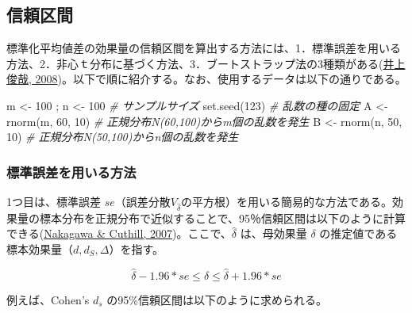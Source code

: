 \documentclass[
  ja=standard, xelatex, base=12pt]{bxjsreport}
\newenvironment{Shaded}{\begin{snugshade}}{\end{snugshade}}
\newcommand{\CommentTok}[1]{\textcolor[rgb]{0.56,0.35,0.01}{\textit{#1}}}
\newcommand{\DecValTok}[1]{\textcolor[rgb]{0.00,0.00,0.81}{#1}}
\newcommand{\FunctionTok}[1]{\textcolor[rgb]{0.00,0.00,0.00}{#1}}
\newcommand{\NormalTok}[1]{#1}
\newcommand{\OtherTok}[1]{\textcolor[rgb]{0.56,0.35,0.01}{#1}}
\begin{document}
\hypertarget{ux4fe1ux983cux533aux9593}{%
\subsection{信頼区間}\label{ux4fe1ux983cux533aux9593}}

標準化平均値差の効果量の信頼区間を算出する方法には、1．標準誤差を用いる方法、2．非心ｔ分布に基づく方法、3．ブートストラップ法の3種類がある(\protect\hyperlink{ref-inoue2008}{井上俊哉, 2008})。以下で順に紹介する。なお、使用するデータは以下の通りである。

\begin{Shaded}
\begin{Highlighting}[]
\NormalTok{m }\OtherTok{\textless{}{-}} \DecValTok{100}\NormalTok{ ; n }\OtherTok{\textless{}{-}} \DecValTok{100}   \CommentTok{\# サンプルサイズ}
\FunctionTok{set.seed}\NormalTok{(}\DecValTok{123}\NormalTok{)         }\CommentTok{\# 乱数の種の固定}
\NormalTok{A }\OtherTok{\textless{}{-}} \FunctionTok{rnorm}\NormalTok{(m, }\DecValTok{60}\NormalTok{, }\DecValTok{10}\NormalTok{) }\CommentTok{\# 正規分布N(60,100)からm個の乱数を発生}
\NormalTok{B }\OtherTok{\textless{}{-}} \FunctionTok{rnorm}\NormalTok{(n, }\DecValTok{50}\NormalTok{, }\DecValTok{10}\NormalTok{) }\CommentTok{\# 正規分布N(50,100)からn個の乱数を発生}
\end{Highlighting}
\end{Shaded}

\hypertarget{ux6a19ux6e96ux8aa4ux5deeux3092ux7528ux3044ux308bux65b9ux6cd5}{%
\subsubsection{標準誤差を用いる方法}\label{ux6a19ux6e96ux8aa4ux5deeux3092ux7528ux3044ux308bux65b9ux6cd5}}

1つ目は、標準誤差 \(se\)（誤差分散\(V_{\hat\delta}\)の平方根）を用いる簡易的な方法である。効果量の標本分布を正規分布で近似することで、95％信頼区間は以下のように計算できる(\protect\hyperlink{ref-nakagawa2007}{Nakagawa \& Cuthill, 2007})。ここで、\(\hat\delta\) は、母効果量 \(\delta\) の推定値である標本効果量（\(d, d_S, \Delta\)）を指す。

\[
\hat{\delta}-1.96*se\leq\delta\leq\hat{\delta}+1.96*se
\]

例えば、Cohen's \(d_s\) の95\%信頼区間は以下のように求められる。
\end{document}
